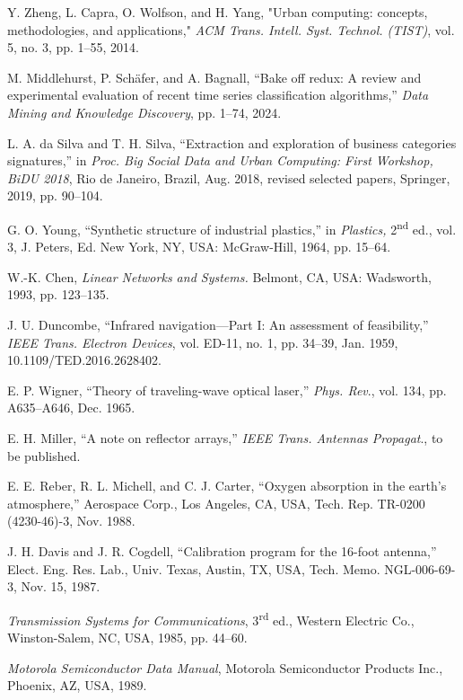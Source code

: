 \documentclass{ieeeaccess}
\begin{document}
\begin{thebibliography}{00}

 Y. Zheng, L. Capra, O. Wolfson, and H. Yang, "Urban computing: concepts, methodologies, and applications," \emph{ACM Trans. Intell. Syst. Technol. (TIST)}, vol. 5, no. 3, pp. 1--55, 2014.

 M. Middlehurst, P. Schäfer, and A. Bagnall, ``Bake off redux: A review and experimental evaluation of recent time series classification algorithms,'' \emph{Data Mining and Knowledge Discovery}, pp. 1--74, 2024.

 L. A. da Silva and T. H. Silva, ``Extraction and exploration of business categories signatures,'' in \emph{Proc. Big Social Data and Urban Computing: First Workshop, BiDU 2018}, Rio de Janeiro, Brazil, Aug. 2018, revised selected papers, Springer, 2019, pp. 90--104.

 G. O. Young, ``Synthetic structure of industrial plastics,'' in \emph{Plastics,} 2\textsuperscript{nd} ed., vol. 3, J. Peters, Ed. New York, NY, USA: McGraw-Hill, 1964, pp. 15--64.

 W.-K. Chen, \emph{Linear Networks and Systems.} Belmont, CA, USA: Wadsworth, 1993, pp. 123--135.

 J. U. Duncombe, ``Infrared navigation---Part I: An assessment of feasibility,'' \emph{IEEE Trans. Electron Devices}, vol. ED-11, no. 1, pp. 34--39, Jan. 1959, 10.1109/TED.2016.2628402.

 E. P. Wigner, ``Theory of traveling-wave optical laser,'' \emph{Phys. Rev}., vol. 134, pp. A635--A646, Dec. 1965.

 E. H. Miller, ``A note on reflector arrays,'' \emph{IEEE Trans. Antennas Propagat}., to be published.

 E. E. Reber, R. L. Michell, and C. J. Carter, ``Oxygen absorption in the earth's atmosphere,'' Aerospace Corp., Los Angeles, CA, USA, Tech. Rep. TR-0200 (4230-46)-3, Nov. 1988.

 J. H. Davis and J. R. Cogdell, ``Calibration program for the 16-foot antenna,'' Elect. Eng. Res. Lab., Univ. Texas, Austin, TX, USA, Tech. Memo. NGL-006-69-3, Nov. 15, 1987.

 \emph{Transmission Systems for Communications}, 3\textsuperscript{rd} ed., Western Electric Co., Winston-Salem, NC, USA, 1985, pp. 44--60.

 \emph{Motorola Semiconductor Data Manual}, Motorola Semiconductor Products Inc., Phoenix, AZ, USA, 1989.


\end{thebibliography}
\end{document}
